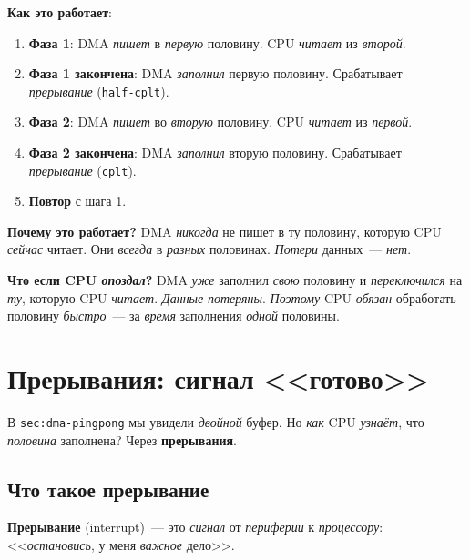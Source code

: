 \textbf{Как это работает}:
\begin{enumerate}
    \item \textbf{Фаза 1}: DMA \emph{пишет} в \emph{первую}
          половину. CPU \emph{читает} из \emph{второй}.
    \item \textbf{Фаза 1 закончена}: DMA \emph{заполнил}
          первую половину. Срабатывает \emph{прерывание}
          (\texttt{half-cplt}).
    \item \textbf{Фаза 2}: DMA \emph{пишет} во \emph{вторую}
          половину. CPU \emph{читает} из \emph{первой}.
    \item \textbf{Фаза 2 закончена}: DMA \emph{заполнил}
          вторую половину. Срабатывает \emph{прерывание}
          (\texttt{cplt}).
    \item \textbf{Повтор} с шага 1.
\end{enumerate}

\begin{keybox}
\textbf{Почему это работает?} DMA \emph{никогда} не
пишет в ту половину, которую CPU \emph{сейчас} читает.
Они \emph{всегда} в \emph{разных} половинах. \emph{Потери}
данных~--- \emph{нет}.
\end{keybox}

\begin{warnbox}
\textbf{Что если CPU \emph{опоздал}?} DMA \emph{уже}
заполнил \emph{свою} половину и \emph{переключился}
на \emph{ту}, которую CPU \emph{читает}. \emph{Данные}
\emph{потеряны}. \emph{Поэтому} CPU \emph{обязан}
обработать половину \emph{быстро}~--- за \emph{время}
заполнения \emph{одной} половины.
\end{warnbox}







\section{Прерывания: сигнал <<готово>>}
\label{sec:adc-interrupts}

В \texttt{sec:dma-pingpong} мы увидели \emph{двойной}
буфер. Но \emph{как} CPU \emph{узнаёт}, что \emph{половина}
заполнена? Через \textbf{прерывания}.

\subsection{Что такое прерывание}

\textbf{Прерывание} (interrupt)~--- это \emph{сигнал}
от \emph{периферии} к \emph{процессору}: <<\emph{остановись},
у меня \emph{важное} дело>>.

